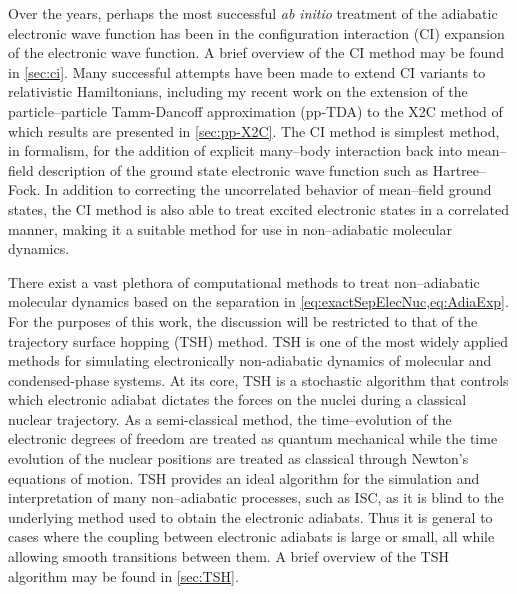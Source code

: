 Over the years, perhaps the most successful \emph{ab initio} treatment of the
adiabatic electronic wave function has been in the configuration interaction
(CI) expansion of the electronic wave function. A brief overview of the CI
method may be found in \cref{sec:ci}.  Many successful attempts have been made
to extend CI variants to relativistic Hamiltonians\cite{Neese13_JCP104113,
Olsen97_TCA125, Jensen96_JCP4083}, including my recent work on the extension of
the particle--particle Tamm-Dancoff approximation (pp-TDA) to the X2C method
\cite{DBWY16_Accepted1} of which results are presented in \cref{sec:pp-X2C}. The
CI method is simplest method, in formalism, for the addition of explicit
many--body interaction back into mean--field description of the ground state
electronic wave function such as Hartree--Fock. In addition to correcting the
uncorrelated behavior of mean--field ground states, the CI method is also able
to treat excited electronic states in a correlated manner, making it a suitable
method for use in non--adiabatic molecular dynamics.

There exist a vast plethora of computational methods to treat non--adiabatic
molecular dynamics based on the separation in
\cref{eq:exactSepElecNuc,eq:AdiaExp}. For the purposes of this work, the
discussion will be restricted to that of the trajectory surface hopping (TSH)
method.  TSH is one of the most widely applied methods for simulating
electronically non-adiabatic dynamics of molecular and condensed-phase
systems.\cite{Barbatti11_1759, Tavernelli14_62, Tully12_22A301, Tully98_407,
Hynes14_97} At its core, TSH is a stochastic algorithm that controls which
electronic adiabat dictates the forces on the nuclei during a classical nuclear
trajectory.\cite{Preston71_562} As a semi-classical method, the time--evolution
of the electronic degrees of freedom are treated as quantum mechanical while the
time evolution of the nuclear positions are treated as classical through
Newton's equations of motion. 
TSH provides an ideal algorithm for the simulation and interpretation of many
non--adiabatic processes, such as ISC, as it is blind to the underlying method
used to obtain the electronic adiabats. Thus it is general to cases where the
coupling between electronic adiabats is large or small, all while allowing
smooth transitions between them. A brief overview of the TSH algorithm may be
found in \cref{sec:TSH}. 


